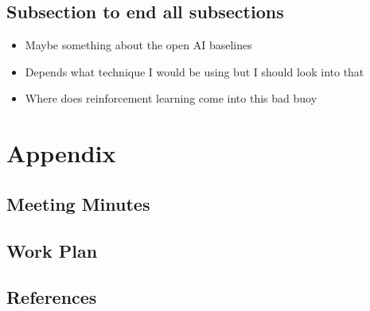\documentclass[a4paper]{article}
\begin{document}
\subsection{Subsection to end all subsections}
\begin{itemize}
    \item Maybe something about the open AI baselines
    \item Depends what technique I would be using but I should look into that
    \item Where does reinforcement learning come into this bad buoy
\end{itemize}


\pagebreak
\section{Appendix}

\subsection{Meeting Minutes}


\pagebreak
\subsection{Work Plan}


\subsection{References}


\end{document}
